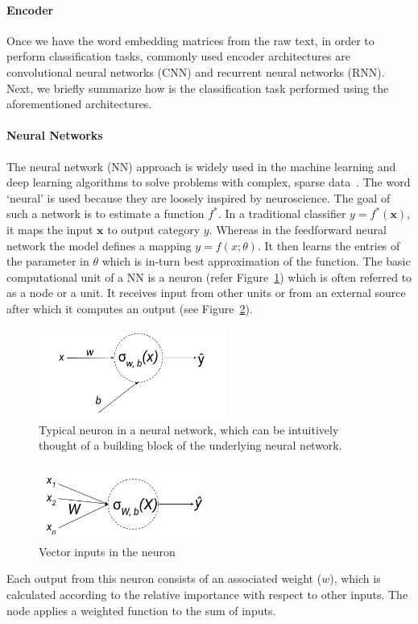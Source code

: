 \paragraph{Encoder} Once we have the word embedding matrices from the raw text, in order to perform classification tasks, commonly used encoder architectures are convolutional neural networks (CNN) and recurrent neural networks (RNN). Next, we briefly summarize how is the classification task performed using the aforementioned architectures.

\paragraph{Neural Networks}
The neural network (NN) approach is widely used in the machine learning and deep learning algorithms to solve problems with complex, sparse data~\cite{lecun2015deep}. The word `neural' is used because they are loosely inspired by neuroscience. 
The goal of such a network is to estimate a function $f^*$.  In a traditional classifier $ y = f^*(\textbf{x})$, it maps the input $\textbf{x}$ to output category $y$. Whereas in the feedforward neural network the model defines a mapping $ y = f(x;\theta)$. It then learns the entries of the parameter in $\theta$ which is in-turn best approximation of the function. 
The basic computational unit of a NN is a neuron (refer Figure~\ref{fig:neuron}) which is often referred to as a node or a unit. It receives input from other units or from an external source after which it computes an output (see Figure~\ref{fig:vectorinputs}).
\begin{figure}[!htb]
    \centering
    \includegraphics[width=0.55\textwidth, center]{Figures/neuron.png}
    \caption{Typical neuron in a neural network, which can be intuitively thought of a building block of the underlying neural network.}
    \label{fig:neuron}
\end{figure}
\begin{figure}[!htb]
    \includegraphics[width=0.5\textwidth, center]{Figures/Vector-Inputs-to-Neuron.png}
    \caption{Vector inputs in the neuron}
    \label{fig:vectorinputs}
\end{figure}
Each output from this neuron consists of an associated weight ($w$), which is calculated according to the relative importance with respect to other inputs. The node applies a weighted function to the sum of inputs.

